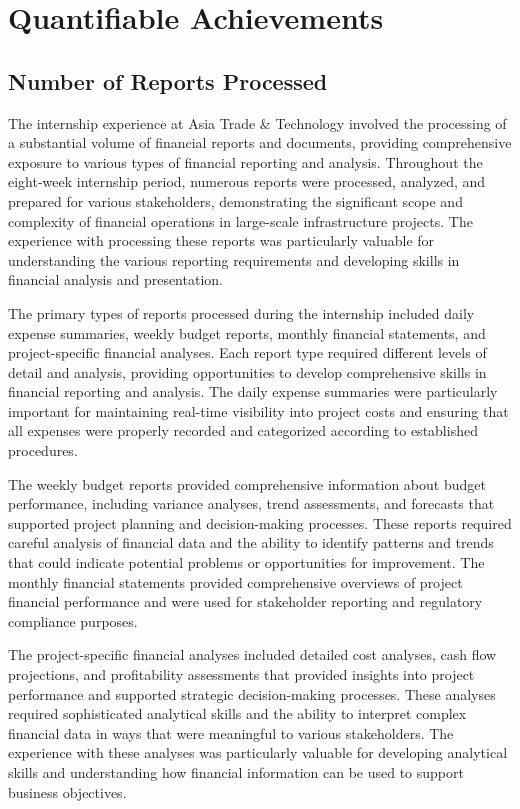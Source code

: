 \section{Quantifiable Achievements}

\subsection{Number of Reports Processed}
The internship experience at Asia Trade \& Technology involved the processing of a substantial volume of financial reports and documents, providing comprehensive exposure to various types of financial reporting and analysis. Throughout the eight-week internship period, numerous reports were processed, analyzed, and prepared for various stakeholders, demonstrating the significant scope and complexity of financial operations in large-scale infrastructure projects. The experience with processing these reports was particularly valuable for understanding the various reporting requirements and developing skills in financial analysis and presentation.

The primary types of reports processed during the internship included daily expense summaries, weekly budget reports, monthly financial statements, and project-specific financial analyses. Each report type required different levels of detail and analysis, providing opportunities to develop comprehensive skills in financial reporting and analysis. The daily expense summaries were particularly important for maintaining real-time visibility into project costs and ensuring that all expenses were properly recorded and categorized according to established procedures.

The weekly budget reports provided comprehensive information about budget performance, including variance analyses, trend assessments, and forecasts that supported project planning and decision-making processes. These reports required careful analysis of financial data and the ability to identify patterns and trends that could indicate potential problems or opportunities for improvement. The monthly financial statements provided comprehensive overviews of project financial performance and were used for stakeholder reporting and regulatory compliance purposes.

The project-specific financial analyses included detailed cost analyses, cash flow projections, and profitability assessments that provided insights into project performance and supported strategic decision-making processes. These analyses required sophisticated analytical skills and the ability to interpret complex financial data in ways that were meaningful to various stakeholders. The experience with these analyses was particularly valuable for developing analytical skills and understanding how financial information can be used to support business objectives.

